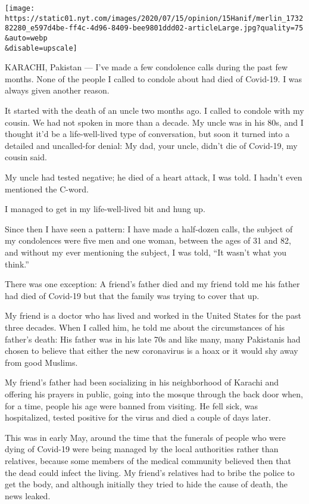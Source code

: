 \texttt{[image: https://static01.nyt.com/images/2020/07/15/opinion/15Hanif/merlin\_173282280\_e597d4be-ff4c-4d96-8409-bee9801ddd02-articleLarge.jpg?quality=75\\\&auto=webp\\\&disable=upscale]}

KARACHI, Pakistan --- I've made a few condolence calls during the past
few months. None of the people I called to condole about had died of
Covid-19. I was always given another reason.

It started with the death of an uncle two months ago. I called to
condole with my cousin. We had not spoken in more than a decade. My
uncle was in his 80s, and I thought it'd be a life-well-lived type of
conversation, but soon it turned into a detailed and uncalled-for
denial: My dad, your uncle, didn't die of Covid-19, my cousin said.

My uncle had tested negative; he died of a heart attack, I was told. I
hadn't even mentioned the C-word.

I managed to get in my life-well-lived bit and hung up.

Since then I have seen a pattern: I have made a half-dozen calls, the
subject of my condolences were five men and one woman, between the ages
of 31 and 82, and without my ever mentioning the subject, I was told,
``It wasn't what you think.''

There was one exception: A friend's father died and my friend told me
his father had died of Covid-19 but that the family was trying to cover
that up.

My friend is a doctor who has lived and worked in the United States for
the past three decades. When I called him, he told me about the
circumstances of his father's death: His father was in his late 70s and
like many, many Pakistanis had chosen to believe that either the new
coronavirus is a hoax or it would shy away from good Muslims.

My friend's father had been socializing in his neighborhood of Karachi
and offering his prayers in public, going into the mosque through the
back door when, for a time, people his age were banned from visiting. He
fell sick, was hospitalized, tested positive for the virus and died a
couple of days later.

This was in early May, around the time that the funerals of people who
were dying of Covid-19 were being managed by the local authorities
rather than relatives, because some members of the medical community
believed then that the dead could infect the living. My friend's
relatives had to bribe the police to get the body, and although
initially they tried to hide the cause of death, the news leaked.

